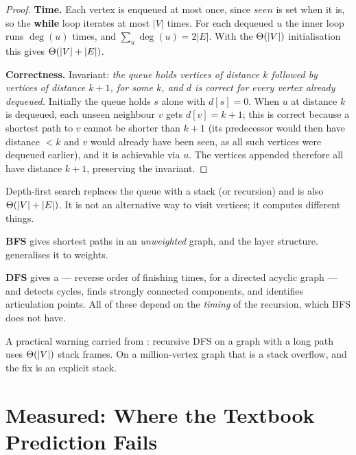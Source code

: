 \begin{proof}
\textbf{Time.} Each vertex is enqueued at most once, since $\mathit{seen}$ is
set when it is, so the \textbf{while} loop iterates at most $|V|$ times. For
each dequeued $u$ the inner loop runs $\deg(u)$ times, and
$\sum_{u} \deg(u) = 2|E|$. With the $\Theta(|V|)$ initialisation this gives
$\Theta(|V|+|E|)$.

\smallskip
\textbf{Correctness.} Invariant: \emph{the queue holds vertices of distance $k$
followed by vertices of distance $k+1$, for some $k$, and $d$ is correct for
every vertex already dequeued.} Initially the queue holds $s$ alone with
$d[s]=0$. When $u$ at distance $k$ is dequeued, each unseen neighbour $v$ gets
$d[v] = k+1$; this is correct because a shortest path to $v$ cannot be shorter
than $k+1$ (its predecessor would then have distance $< k$ and $v$ would
already have been seen, as all such vertices were dequeued earlier), and it is
achievable via $u$. The vertices appended therefore all have distance $k+1$,
preserving the invariant.
\end{proof}

\begin{conceptbox}
Depth-first search replaces the queue with a stack (or recursion) and is also
$\Theta(|V|+|E|)$. It is not an alternative way to visit vertices; it computes
different things.

\begin{tight}
  \item \textbf{BFS} gives shortest paths in an \emph{unweighted} graph, and
        the layer structure.  generalises it to weights.
  \item \textbf{DFS} gives a  --- reverse order of
        finishing times, for a directed acyclic graph --- and detects cycles,
        finds strongly connected components, and identifies articulation
        points. All of these depend on the \emph{timing} of the recursion,
        which BFS does not have.
\end{tight}

\smallskip
A practical warning carried from : recursive DFS on a graph
with a long path uses $\Theta(|V|)$ stack frames. On a million-vertex graph
that is a stack overflow, and the fix is an explicit stack.
\end{conceptbox}

\section{Measured: Where the Textbook Prediction Fails}

